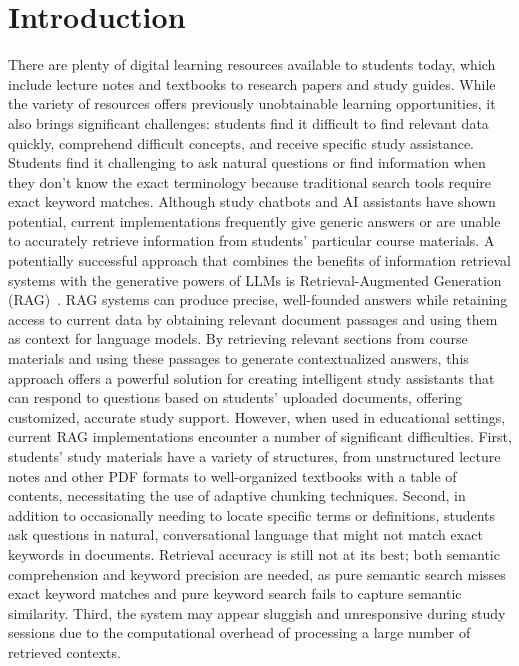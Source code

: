 \documentclass[runningheads]{llncs}
\begin{document}
\section{Introduction}
There are plenty of digital learning resources available to students today, which include lecture notes and textbooks to research papers and study guides. While the variety of resources offers previously unobtainable learning opportunities, it also brings significant challenges: students find it difficult to find relevant data quickly, comprehend difficult concepts, and receive specific study assistance. Students find it challenging to ask natural questions or find information when they don't know the exact terminology because traditional search tools require exact keyword matches. Although study chatbots and AI assistants have shown potential, current implementations frequently give generic answers or are unable to accurately retrieve information from students' particular course materials.
A potentially successful approach that combines the benefits of information retrieval systems with the generative powers of LLMs is Retrieval-Augmented Generation (RAG)~\cite{lewis2020retrieval}. RAG systems can produce precise, well-founded answers while retaining access to current data by obtaining relevant document passages and using them as context for language models. By retrieving relevant sections from course materials and using these passages to generate contextualized answers, this approach offers a powerful solution for creating intelligent study assistants that can respond to questions based on students' uploaded documents, offering customized, accurate study support. However, when used in educational settings, current RAG implementations encounter a number of significant difficulties. First, students' study materials have a variety of structures, from unstructured lecture notes and other PDF formats to well-organized textbooks with a table of contents, necessitating the use of adaptive chunking techniques. Second, in addition to occasionally needing to locate specific terms or definitions, students ask questions in natural, conversational language that might not match exact keywords in documents. Retrieval accuracy is still not at its best; both semantic comprehension and keyword precision are needed, as pure semantic search misses exact keyword matches and pure keyword search fails to capture semantic similarity. Third, the system may appear sluggish and unresponsive during study sessions due to the computational overhead of processing a large number of retrieved contexts.
\end{document}
